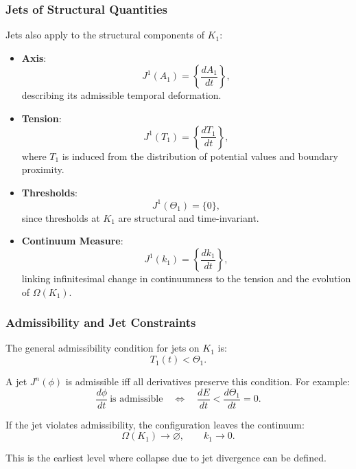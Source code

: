 \subsubsection{Jets of Structural Quantities}

Jets also apply to the structural components of $K_1$:

\begin{itemize}
    \item \textbf{Axis}:
    \[
    J^1(A_1) = \left\{\frac{dA_1}{dt}\right\},
    \]
    describing its admissible temporal deformation.

    \item \textbf{Tension}:
    \[
    J^1(T_1) = \left\{\frac{dT_1}{dt}\right\},
    \]
    where $T_1$ is induced from the distribution of potential values and
    boundary proximity.

    \item \textbf{Thresholds}:
    \[
    J^1(\Theta_1)=\{0\},
    \]
    since thresholds at $K_1$ are structural and time-invariant.

    \item \textbf{Continuum Measure}:
    \[
    J^1(k_1) = \left\{ \frac{dk_1}{dt} \right\},
    \]
    linking infinitesimal change in continuumness to the tension and the
    evolution of $\Omega(K_1)$.
\end{itemize}



\subsubsection{Admissibility and Jet Constraints}

The general admissibility condition for jets on $K_1$ is:
\[
T_1(t) < \Theta_1.
\]

A jet $J^n(\phi)$ is admissible iff all derivatives preserve this
condition. For example:
\[
\frac{d\phi}{dt} \ \text{is admissible}
\quad\Longleftrightarrow\quad
\frac{dE}{dt} < \frac{d\Theta_1}{dt} = 0.
\]

If the jet violates admissibility, the configuration leaves the
continuum:
\[
\Omega(K_1) \to \varnothing,
\qquad
k_1 \to 0.
\]

This is the earliest level where collapse due to jet divergence can be
defined.



